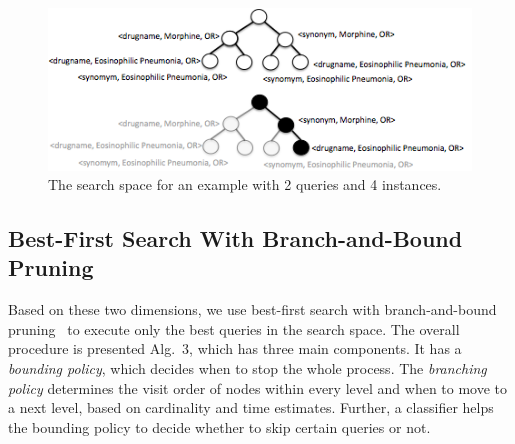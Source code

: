  \begin{figure} 
\vspace{-20pt}
\centering
\includegraphics[scale=0.5]{p22.png}
\caption{The search space for an example with 2 queries and 4 instances.} 
\vspace{-30pt}
\label{fig:space}
\end{figure}

\subsection{Best-First Search With Branch-and-Bound Pruning} 
Based on these two dimensions, we use best-first search with branch-and-bound pruning~\cite{DBLP:journals/jacm/DechterP85} to execute only the best queries in the search space. The overall procedure is presented Alg.~3, which has three main components. It has a \emph{bounding policy}, which decides when to stop the whole process. The \emph{branching policy} determines the visit order of nodes within every level and when to move to a next level, based on cardinality and time estimates. Further, a classifier helps the bounding policy to decide whether to skip certain queries or not. 

